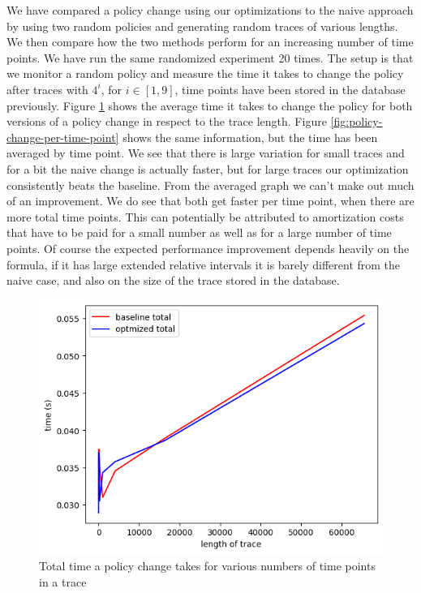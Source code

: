We have compared a policy change using our optimizations to the naive approach by using two random policies and generating random traces of various lengths.
We then compare how the two methods perform for an increasing number of time points.
We have run the same randomized experiment 20 times.
The setup is that we monitor a random policy and measure the time it takes to change the policy after traces with $4^i$, for $i \in [1,9]$, time points have been stored in the database previously.
Figure \ref{fig:policy-change-total} shows the average time it takes to change the policy for both versions of a policy change in respect to the trace length.
Figure \ref{fig:policy-change-per-time-point} shows the same information, but the time has been averaged by time point.
We see that there is large variation for small traces and for a bit the naive change is actually faster, but for large traces our optimization consistently beats the baseline.
From the averaged graph we can't make out much of an improvement.
We do see that both get faster per time point, when there are more total time points.
This can potentially be attributed to amortization costs that have to be paid for a small number as well as for a large number of time points.
Of course the expected performance improvement depends heavily on the formula, if it has large extended relative intervals it is barely different from the naive case, and also on the size of the trace stored in the database.

\begin{figure}
    \centering
    \label{fig:policy-change-total}
    \includegraphics[width=0.8\linewidth]{diagrams/policy-change-total-time.png}
    \caption{Total time a policy change takes for various numbers of time points in a trace}
\end{figure}


